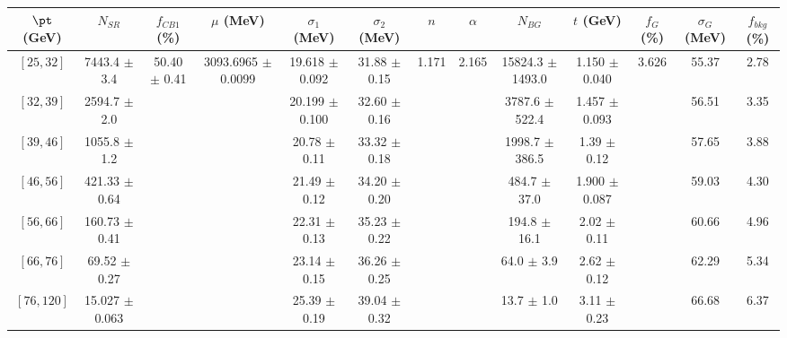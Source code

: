 \begin{tabular}{c||c|c|c|c|c|c|c|c|c|c|c||c}
$\pt$ (GeV) & $N_{SR}$ & $f_{CB1}$ (\%) & $\mu$ (MeV) & $\sigma_1$ (MeV) & $\sigma_2$ (MeV) & $n$ & $\alpha$ & $N_{BG}$ & $t$ (GeV) & $f_G$ (\%) & $\sigma_G$ (MeV) & $f_{bkg}$ (\%) \\
\hline
$[25, 32]$ & 7443.4 $\pm$ 3.4 & \multirow{7}{*}{50.40 $\pm$ 0.41} & \multirow{7}{*}{3093.6965 $\pm$ 0.0099} & 19.618 $\pm$ 0.092 & 31.88 $\pm$ 0.15 & \multirow{7}{*}{1.171} & \multirow{7}{*}{2.165} & 15824.3 $\pm$ 1493.0 & 1.150 $\pm$ 0.040 & \multirow{7}{*}{3.626} & 55.37 & 2.78\\
$[32, 39]$ & 2594.7 $\pm$ 2.0 &  &  & 20.199 $\pm$ 0.100 & 32.60 $\pm$ 0.16 &  &  & 3787.6 $\pm$ 522.4 & 1.457 $\pm$ 0.093 &  & 56.51 & 3.35\\
$[39, 46]$ & 1055.8 $\pm$ 1.2 &  &  & 20.78 $\pm$ 0.11 & 33.32 $\pm$ 0.18 &  &  & 1998.7 $\pm$ 386.5 & 1.39 $\pm$ 0.12 &  & 57.65 & 3.88\\
$[46, 56]$ & 421.33 $\pm$ 0.64 &  &  & 21.49 $\pm$ 0.12 & 34.20 $\pm$ 0.20 &  &  & 484.7 $\pm$ 37.0 & 1.900 $\pm$ 0.087 &  & 59.03 & 4.30\\
$[56, 66]$ & 160.73 $\pm$ 0.41 &  &  & 22.31 $\pm$ 0.13 & 35.23 $\pm$ 0.22 &  &  & 194.8 $\pm$ 16.1 & 2.02 $\pm$ 0.11 &  & 60.66 & 4.96\\
$[66, 76]$ & 69.52 $\pm$ 0.27 &  &  & 23.14 $\pm$ 0.15 & 36.26 $\pm$ 0.25 &  &  & 64.0 $\pm$ 3.9 & 2.62 $\pm$ 0.12 &  & 62.29 & 5.34\\
$[76, 120]$ & 15.027 $\pm$ 0.063 &  &  & 25.39 $\pm$ 0.19 & 39.04 $\pm$ 0.32 &  &  & 13.7 $\pm$ 1.0 & 3.11 $\pm$ 0.23 &  & 66.68 & 6.37\\
\end{tabular}
